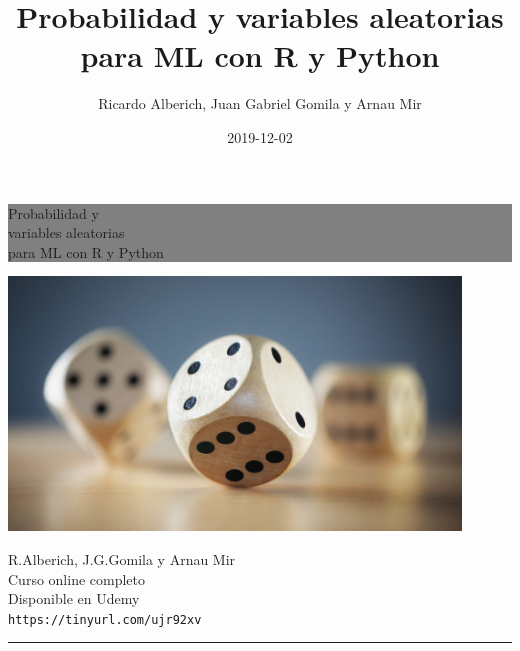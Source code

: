 \documentclass[]{book}
\title{Probabilidad y variables aleatorias para ML con R y Python}
\author{Ricardo Alberich, Juan Gabriel Gomila y Arnau Mir}
\date{2019-12-02}
\begin{document}
\maketitle

\begin{titlepage} %


	\colorbox{grey}{
		\parbox[t]{0.93\textwidth}{ %
			\parbox[t]{0.91\textwidth}{ %
				\raggedleft %
				\fontsize{30pt}{50pt}\selectfont %
				\vspace{0.7cm} %

				Probabilidad y \\
				variables aleatorias \\
				para ML con R y Python\\

				\vspace{0.7cm} %
			}
		}
	}
    \centering

    \includegraphics[width=12cm]{Images/cover.jpg} %


	\vfill %


	\parbox[t]{0.93\textwidth}{ %
		\raggedleft %
		\large %
		{\Large R.Alberich, J.G.Gomila y Arnau Mir}\\[4pt] %
		Curso online completo\\
		Disponible en Udemy\\[4pt] %
		\texttt{https://tinyurl.com/ujr92xv}\\

		\hfill\rule{0.2\linewidth}{1pt}%
	}

\end{titlepage}
\end{document}
